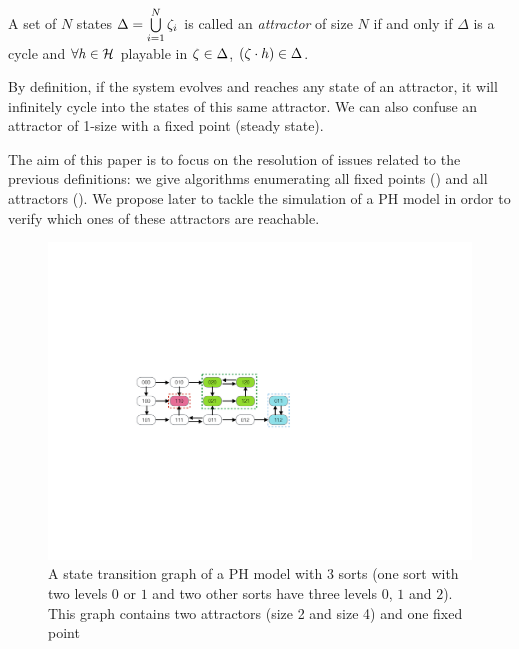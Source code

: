 \begin{definition}[Attractor]
\label{def:attractor}
A set of $N$ states $\Delta = \bigcup\limits_{i=1}^{N} \zeta_{i}$ is called an \emph{attractor} of size $N$ if and only if $\Delta$ is a cycle and $\forall h \in \mathcal{H} $ playable in $\zeta \in \Delta$, $(\zeta \cdot h) \in \Delta$.
\end{definition}

By definition, if the system evolves and reaches any state of an attractor, it will infinitely cycle into the states of this same attractor.
We can also confuse an attractor of 1-size with a fixed point (\ie steady state).

\medskip
The aim of this paper is to focus on the resolution of issues related to the previous definitions:
we give algorithms enumerating all fixed points ()
and all attractors (). We propose later to tackle the simulation of a PH model in ordor to verify which ones of these attractors are reachable.

\begin{figure}[h]
   \caption{\label{fig:transition-graph} A state transition graph of a PH model with 3 sorts (one sort with two levels $0$ or $1$ and two other sorts have three levels $0$, $1$ and $2$). This graph contains two attractors (size 2 and size 4) and one fixed point}
   \includegraphics{figures/transition-graph.pdf}
\end{figure}
